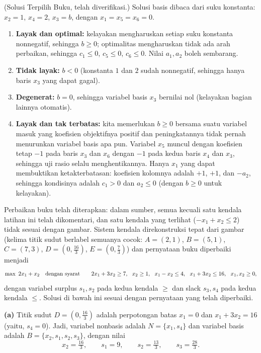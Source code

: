 
(Solusi Terpilih Buku, telah diverifikasi.) Solusi basis dibaca dari
suku konstanta: $x_2 = 1$, $x_4 = 2$, $x_3 = b$, dengan
$x_1 = x_5 = x_6 = 0$.
\begin{enumerate}
\item \textbf{Layak dan optimal:} kelayakan mengharuskan setiap suku konstanta
nonnegatif, sehingga $b \geq 0$; optimalitas mengharuskan tidak ada arah
perbaikan, sehingga $c_1 \leq 0$, $c_5 \leq 0$, $c_6 \leq 0$. Nilai
$a_1, a_2$ boleh sembarang.
\item \textbf{Tidak layak:} $b < 0$ (konstanta $1$ dan $2$
sudah nonnegatif, sehingga hanya baris $x_3$ yang dapat gagal).
\item \textbf{Degenerat:} $b = 0$, sehingga variabel basis $x_3$
bernilai nol (kelayakan bagian lainnya otomatis).
\item \textbf{Layak dan tak terbatas:} kita memerlukan $b \geq 0$ bersama suatu
variabel masuk yang koefisien objektifnya positif dan peningkatannya
tidak pernah menurunkan variabel basis apa pun. Variabel $x_5$ muncul
dengan koefisien tetap $-1$ pada baris $x_3$ dan $x_6$ dengan $-1$ pada kedua
baris $x_4$ dan $x_3$, sehingga uji rasio selalu menghentikannya. Hanya $x_1$
yang dapat membuktikan ketakterbatasan: koefisien kolomnya adalah $+1$, $+1$, dan
$-a_2$, sehingga kondisinya adalah $c_1 > 0$ dan $a_2 \leq 0$ (dengan $b \geq 0$
untuk kelayakan).
\end{enumerate}


\begin{qaflag}
Perbaikan buku telah diterapkan: dalam sumber, semua kecuali satu kendala latihan ini
telah dikomentari, dan satu kendala yang terlihat
($-x_1 + x_2 \leq 2$) tidak sesuai dengan gambar. Sistem kendala
direkonstruksi tepat dari gambar (kelima titik sudut berlabel semuanya cocok:
$A = (2,1)$, $B = (5,1)$, $C = (7,3)$, $D = (0, \tfrac{16}{3})$,
$E = (0, \tfrac{7}{3})$) dan pernyataan buku diperbaiki menjadi
\[
\max\ 2x_1 + x_2 \quad \mbox{dengan syarat}\quad\quad 2x_1 + 3x_2 \geq 7,\ \
x_2 \geq 1,\ \ x_1 - x_2 \leq 4,\ \ x_1 + 3x_2 \leq 16,\ \ x_1, x_2 \geq 0,
\]
dengan variabel surplus $s_1, s_2$ pada kedua kendala $\geq$ dan slack
$s_3, s_4$ pada kedua kendala $\leq$. Solusi di bawah ini sesuai dengan
pernyataan yang telah diperbaiki.
\end{qaflag}

\textbf{(a)} Titik sudut $D = (0, \tfrac{16}{3})$ adalah perpotongan
batas $x_1 = 0$ dan $x_1 + 3x_2 = 16$ (yaitu, $s_4 = 0$). Jadi,
variabel nonbasis adalah $N = \{x_1, s_4\}$ dan variabel basis adalah
$B = \{x_2, s_1, s_2, s_3\}$, dengan nilai
\[
x_2 = \tfrac{16}{3}, \qquad s_1 = 9, \qquad s_2 = \tfrac{13}{3},
\qquad s_3 = \tfrac{28}{3}.
\]

